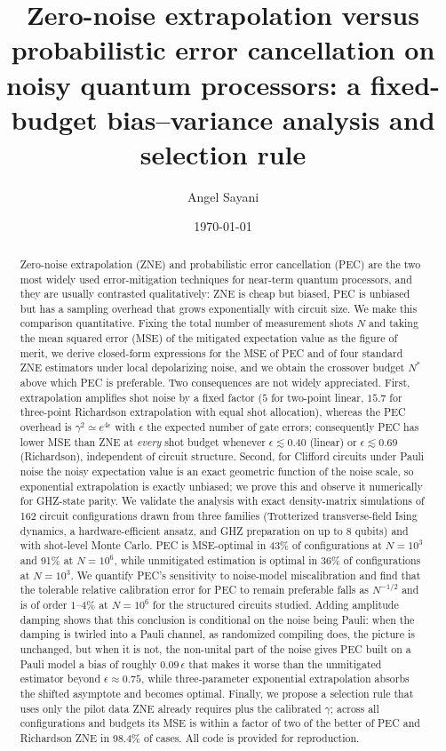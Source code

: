 \documentclass[aps,pra,reprint,amsmath,amssymb,nofootinbib,superscriptaddress]{revtex4-2}
\theoremstyle{remark}
\newcommand{\eps}{\epsilon}
\begin{document}
\title{Zero-noise extrapolation versus probabilistic error cancellation on noisy quantum processors: a fixed-budget bias--variance analysis and selection rule}
\author{Angel Sayani}
\date{\today}

\begin{abstract}
Zero-noise extrapolation (ZNE) and probabilistic error cancellation (PEC) are the two most widely used error-mitigation techniques for near-term quantum processors, and they are usually contrasted qualitatively: ZNE is cheap but biased, PEC is unbiased but has a sampling overhead that grows exponentially with circuit size. We make this comparison quantitative. Fixing the total number of measurement shots $N$ and taking the mean squared error (MSE) of the mitigated expectation value as the figure of merit, we derive closed-form expressions for the MSE of PEC and of four standard ZNE estimators under local depolarizing noise, and we obtain the crossover budget $N^*$ above which PEC is preferable. Two consequences are not widely appreciated. First, extrapolation amplifies shot noise by a fixed factor ($5$ for two-point linear, $15.7$ for three-point Richardson extrapolation with equal shot allocation), whereas the PEC overhead is $\gamma^2 \simeq e^{4\eps}$ with $\eps$ the expected number of gate errors; consequently PEC has lower MSE than ZNE at \emph{every} shot budget whenever $\eps \lesssim 0.40$ (linear) or $\eps \lesssim 0.69$ (Richardson), independent of circuit structure. Second, for Clifford circuits under Pauli noise the noisy expectation value is an exact geometric function of the noise scale, so exponential extrapolation is exactly unbiased; we prove this and observe it numerically for GHZ-state parity. We validate the analysis with exact density-matrix simulations of 162 circuit configurations drawn from three families (Trotterized transverse-field Ising dynamics, a hardware-efficient ansatz, and GHZ preparation on up to 8 qubits) and with shot-level Monte Carlo. PEC is MSE-optimal in 43\% of configurations at $N=10^3$ and 91\% at $N=10^6$, while unmitigated estimation is optimal in 36\% of configurations at $N=10^3$. We quantify PEC's sensitivity to noise-model miscalibration and find that the tolerable relative calibration error for PEC to remain preferable falls as $N^{-1/2}$ and is of order $1$--$4\%$ at $N=10^6$ for the structured circuits studied. Adding amplitude damping shows that this conclusion is conditional on the noise being Pauli: when the damping is twirled into a Pauli channel, as randomized compiling does, the picture is unchanged, but when it is not, the non-unital part of the noise gives PEC built on a Pauli model a bias of roughly $0.09\,\eps$ that makes it worse than the unmitigated estimator beyond $\eps\approx0.75$, while three-parameter exponential extrapolation absorbs the shifted asymptote and becomes optimal. Finally, we propose a selection rule that uses only the pilot data ZNE already requires plus the calibrated $\gamma$; across all configurations and budgets its MSE is within a factor of two of the better of PEC and Richardson ZNE in 98.4\% of cases. All code is provided for reproduction.
\end{abstract}
\end{document}
